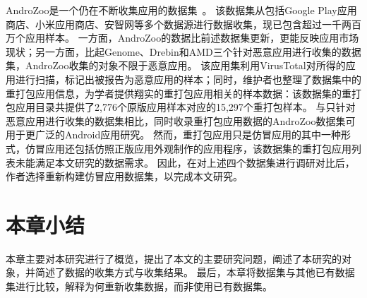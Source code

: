AndroZoo是一个仍在不断收集应用的数据集~\cite{li2017androzoo++}。
该数据集从包括Google Play应用商店、小米应用商店、安智网等多个数据源进行数据收集，现已包含超过一千两百万个应用样本。
一方面，AndroZoo的数据比前述数据集更新，更能反映应用市场现状；另一方面，比起Genome、Drebin和AMD三个针对恶意应用进行收集的数据集，AndroZoo收集的对象不限于恶意应用。
该应用集利用VirusTotal对所得的应用进行扫描，标记出被报告为恶意应用的样本；同时，维护者也整理了数据集中的重打包应用信息，为学者提供翔实的重打包应用相关的样本数据：该数据集的重打包应用目录共提供了2,776个原版应用样本对应的15,297个重打包样本。
与只针对恶意应用进行收集的数据集相比，同时收录重打包应用数据的AndroZoo数据集可用于更广泛的Android应用研究。
然而，重打包应用只是仿冒应用的其中一种形式，仿冒应用还包括仿照正版应用外观制作的应用程序，该数据集的重打包应用列表未能满足本文研究的数据需求。
因此，在对上述四个数据集进行调研对比后，作者选择重新构建仿冒应用数据集，以完成本文研究。




\section{本章小结}

本章主要对本研究进行了概览，提出了本文的主要研究问题，阐述了本研究的对象，并简述了数据的收集方式与收集结果。
最后，本章将数据集与其他已有数据集进行比较，解释为何重新收集数据，而非使用已有数据集。
